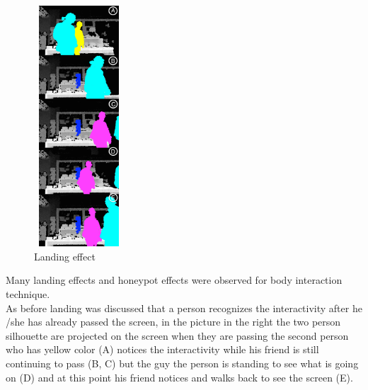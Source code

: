 \begin{figure}
  \vspace{-60pt}
  \begin{center}
    \includegraphics[width=0.30\textwidth,height=90mm]{figures/8/body_inter_findings/effects/landing}
  \end{center}
  \vspace{-20pt}
  \caption{Landing effect}
  \vspace{-10pt}
\end{figure}
Many landing effects and honeypot effects were observed for body interaction technique. \\
As before landing was discussed that a person recognizes the interactivity after he /she has already passed the screen, in the picture in the right the two person silhouette are projected on the screen when they are passing the second person who has yellow color (A) notices the interactivity while his friend is still continuing to pass (B, C) but the guy the person is standing to see what is going on (D) and at this point his friend notices and walks back to see the screen (E).  \\

